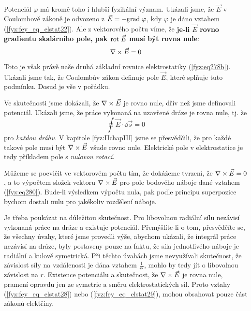 {    Potenciál \(\varphi\) má kromě toho i hlubší fyzikální význam. Ukázali jsme, že \(\vec{E}\) v 
    Coulombově zákoně je odvozeno z \(\vec{E}= -\mathrm{grad\;}\varphi\), kdy \(\varphi\) je dáno vztahem 
    (\ref{fyz:fey_eq_elstat22}). Ale z vektorového počtu víme, že \textbf{je-li \(\vec{E}\) rovno 
    gradientu skalárního pole, pak \(\mathrm{rot}\;\vec{E}\) musí být rovna nule}:
    \begin{equation}\label{fyz:fey_eq_elstat29}
     \nabla\times\vec{E} = 0 
    \end{equation}
    
    Toto je však právě naše druhá základní rovnice elektrostatiky (\ref{fyz:eq278b}). 
    Ukázali jsme tak, že Coulombův zákon definuje pole \(\vec{E}\), které splňuje tuto podmínku. 
    Dosud je vše v pořádku.
    
    Ve skutečnosti jsme dokázali, že \(\nabla\times\vec{E}\) je rovno nule, dřív než jsme definovali 
    potenciál. Ukázali jsme, že práce vykonaná na uzavřené dráze je rovna nule, tj. že
    \begin{equation*}
     \oint\vec{E}\cdot\dd{\vec{s}} = 0 
    \end{equation*}  
    pro \emph{každou dráhu}. V kapitole \ref{fyz:IIchapIII} jsme se přesvědčili, že pro 
    každé takové pole musí být \(\nabla\times\vec{E}\) všude rovno nule. Elektrické pole v elektrostatice je 
    tedy příkladem pole s \emph{nulovou rotací}. 
    
    Můžeme se pocvičit ve vektorovém počtu tím, že dokážeme tvrzení, že \(\nabla\times\vec{E}=0\), a to 
    výpočtem složek vektoru \(\nabla\times\vec{E}\) pro pole bodového náboje dané vztahem 
    (\ref{fyz:eq280}). Bude-li výsledkem výpočtu nula, pak podle principu superpozice 
    bychom dostali nulu pro jakékoliv rozdělení náboje.
    
    Je třeba poukázat na důležitou skutečnost. Pro libovolnou radiální sílu nezávisí vykonaná práce 
    na dráze a existuje potenciál. Přemýšlíte-li o tom, přesvědčíte se, že všechny úvahy, které 
    jsme provedli výše, abychom ukázali, že integrál práce nezávisí na dráze, byly postaveny pouze 
    na faktu, že síla jednotlivého náboje je radiální a kulově symetrická. Při těchto úvahách jsme 
    nevyužívali skutečnost, že závislost síly na vzdálenosti je dána vztahem \(\frac{1}{r^2}\), 
    mohlo by tedy jít o libovolnou závislost na \(r\). Existence potenciálu a skutečnost, že 
    \(\nabla\times\vec{E}\) je rovna nule, pramení opravdu jen ze symetrie a směru elektrostatických sil. 
    Proto vztahy (\ref{fyz:fey_eq_elstat28}) nebo (\ref{fyz:fey_eq_elstat29}), mohou obsahovat 
    pouze část zákonů elektřiny. 
 
}
